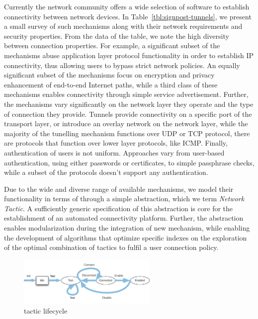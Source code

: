 Currently the network community offers a wide selection of software to establish
connectivity between network devices. In Table~\ref{tbl:signpost-tunnels}, we
present a small survey of such mechanisms along with their network requirements
and security properties.  From the data of the table, we note the high diversity
between connection properties. For example, a significant subset of the
mechanisms abuse application layer protocol functionality in order to establish
IP connectivity, thus allowing users to bypass strict network policies. An equally
significant subset of the mechanisms focus on encryption and privacy enhancement
of end-to-end Internet paths, while a third class of these
mechanisms enables connectivity through simple service advertisement. Further,
the mechanisms vary significantly on the network layer they operate and the type
of connection they provide.  Tunnels provide connectivity on a specific port of
the transport layer, or introduce an overlay network on the network layer, while
the majority of the tunelling mechanism functions over UDP or TCP
protocol, there are protocols that function over lower layer protocols, like
ICMP. Finally, authentication of users is not uniform.  Approaches vary from
user-based authentication, using either passwords or certificates, 
to simple passphrase checks, while a subset of the protocols doesn't
support any authentication. 

Due to the wide and diverse range of available mechanisms, we model their
functionality in terms of \signpost through a simple abstraction, which we term
{\it Network Tactic}. A sufficiently generic specification of this abstraction
is core for the establishment of an automated connectivity platform.  Further,
the abstraction enables modularization during the integration of new mechanism,
while enabling the development of algorithms that optimize specific indexes on
the exploration of the optimal combination of tactics to fulfil a user
connection policy.

\begin{figure}
  \begin{center}
	\includegraphics[width=0.6\textwidth]{signpost-tactic}
  \end{center}
  \caption{\signpost tactic lifecycle}
  \label{fig:signpost-tactic}
\end{figure}

